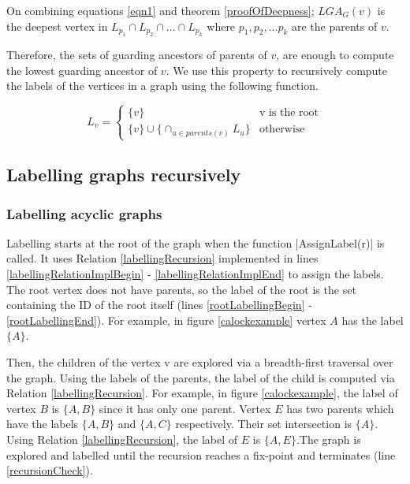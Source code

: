 
On combining equations \ref{eqn1} and theorem \ref{proofOfDeepness}; $LGA_G(v)$ is the deepest vertex in $ L_{p_1} \cap L_{p_2} \cap ... \cap L_{p_k}$ where $p_1, p_2, ... p_k$ are the parents of $v$.

Therefore, the sets of guarding ancestors of parents of $v$, are enough to compute the lowest guarding ancestor of $v$. 
We use this property to recursively compute the labels of the vertices in a graph using the following function.

\begin{equation}\label{labellingRecursion}
	L_v = 
	\begin{cases}
		\{v\} & \text{v is the root} \\
		\{v\} \cup \{ \cap_{u\in parents(v)} L_u\} & \text{otherwise}
	\end{cases}
\end{equation}


\subsection{Labelling graphs recursively}

\subsubsection{Labelling acyclic graphs}
Labelling starts at the root of the graph when the function \inline|AssignLabel(r)| is called. It uses Relation \ref{labellingRecursion} implemented in lines \ref{labellingRelationImplBegin} - \ref{labellingRelationImplEnd} to assign the labels. The root vertex does not have parents, so the label of the root is the set containing the ID of the root itself (lines \ref{rootLabellingBegin} - \ref{rootLabellingEnd}). For example, in figure \ref{calockexample} vertex $A$ has the label $\{A\}$.

Then, the children of the vertex v are explored via a breadth-first traversal over the graph. Using the labels of the parents, the label of the child is computed via Relation \ref{labellingRecursion}. For example, in figure \ref{calockexample}, the label of vertex $B$ is $\{A, B\}$ since it has only one parent. Vertex $E$ has two parents which have the labels $\{A, B\}$ and $\{A, C\}$ respectively. Their set intersection is $\{A\}$. Using Relation \ref{labellingRecursion}, the label of $E$ is $\{A, E\}$.The graph is explored and labelled until the recursion reaches a fix-point and terminates (line \ref{recursionCheck}). 

